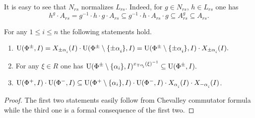 It is easy to see that $N_{rs}$ normalizes $L_{rs}$. Indeed, for $g\in N_{rs}$, $h\in L_{rs}$ one has
$$h^g \cdot A_{rs} = g^{-1} \cdot h \cdot g \cdot A_{rs} \subseteq g^{-1} \cdot h \cdot A_{rs} \cdot g \subseteq A_{rs}^g \subseteq A_{rs}.$$

\begin{lemma}\label{lemma:dv_unipotent} For any $1\leq i\leq n$ the following statements hold. \begin{enumerate} 
\item $\U(\Phi^\pm, I) = X_{\pm\alpha\ssub{i}}(I)\cdot \U(\Phi^\pm\setminus\{\pm\alpha\ssub{i}\}, I) = \U(\Phi^\pm\setminus\{\pm\alpha\ssub{i}\}, I)\cdot X_{\pm\alpha\ssub{i}}(I).$
\item For any $\xi\in R$ one has $\U(\Phi^\pm\setminus\{\alpha_i\}, I)^{x_{\mp\alpha\ssub{i}}(\xi)^{-1}} \subseteq \U(\Phi^\pm, I).$
\item $\U(\Phi^+, I)\cdot \U(\Phi^-, I) \subseteq \U(\Phi^+\setminus \{\alpha_i\}, I) \cdot \U(\Phi^-, I) \cdot X_{\alpha\ssub{i}}(I) \cdot X_{-\alpha\ssub{i}}(I)$.
\end{enumerate} \end{lemma}
\begin{proof}
 The first two statements easily follow from Chevalley commutator formula while the third one is a formal consequence of the first two.
\end{proof}

